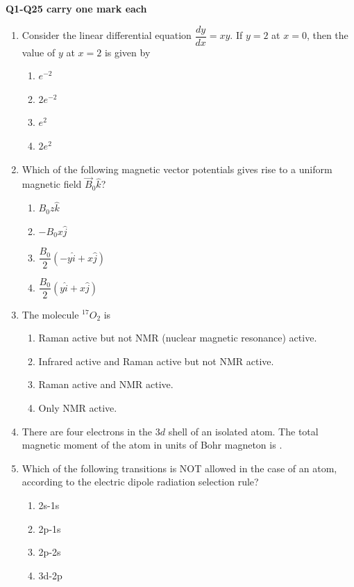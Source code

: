 \documentclass[journal,12pt,onecolumn]{IEEEtran}
\theoremstyle{remark}
\begin{document}
\newpage
\textbf{Q1-Q25 carry one mark each}
\begin{enumerate}


\item Consider the linear differential equation $\dfrac{dy}{dx} = xy$. If $y = 2$ at $x = 0$, then the value of $y$ at $x = 2$ is given by

\begin{multicols}{2}
\begin{enumerate}
    \item $e^{-2}$
    \item $2e^{-2}$
    \item $e^{2}$
    \item $2e^{2}$
\end{enumerate}
\end{multicols}

\item Which of the following magnetic vector potentials gives rise to a uniform magnetic field $\vec{B}_0 \hat{k}$?
\begin{multicols}{2}
\begin{enumerate}
    \item $B_0 z \hat{k}$
    \item $-B_0 x \hat{j}$
    \item $\dfrac{B_0}{2}
    (-y\hat{i} + x\hat{j})$
    \item $\dfrac{B_0}{2}
    (y\hat{i} + x\hat{j})$
\end{enumerate}
\end{multicols}

\item The molecule $^{17}O_{2}$ is
\begin{enumerate}
    \item Raman active but not NMR (nuclear magnetic resonance) active.
    \item Infrared active and Raman active but not NMR active.
    \item Raman active and NMR active.
    \item Only NMR active.
\end{enumerate}

\item There are four electrons in the $3d$ shell of an isolated atom. The total magnetic moment of the atom in units of Bohr magneton is \underline{\hspace{2cm}}.

\item Which of the following transitions is NOT allowed in the case of an atom, according to the electric dipole radiation selection rule?
\begin{multicols}{4}
\begin{enumerate}
    \item 2s-1s
    \item 2p-1s
    \item 2p-2s
    \item 3d-2p
\end{enumerate}
\end{multicols}


\end{enumerate}
\end{document}
